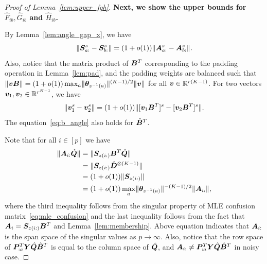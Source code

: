 \documentclass[journal]{IEEEtran}
\theoremstyle{definition}
\theoremstyle{definition}
\begin{document}
\begin{proof}[Proof of Lemma~\ref{lem:upper_fgh}]
{\textbf{Next, we show the upper bounds for $\hat F_{ib}, \hat G_{ib}$ and $\hat H_{ib}$.}

By Lemma~\ref{lem:angle_gap_x}, we have 
\begin{equation}
    \lVert\bm S_{a:}^s - \bm S_{b:}^s\rVert  = (1 + o(1)) \lVert\bm A_{a:}^s - \bm A_{b:}^s\rVert.
\end{equation}
Also, notice that the matrix product of $ \bm B^T$ corresponding to the padding operation in Lemma~\ref{lem:pad}, and the padding weights are balanced such that $\lVert\bm{v} \bm B\rVert  = (1 + o(1)) \max_{a} \lVert\boldsymbol{\theta}_{z^{-1}(a)}\rVert^{(K-1)/2} \lVert\bm{v}\rVert $ for all $\bm{v} \in \mathbb{R}^{r(K-1)}$. For two vectors $\bm{v}_1, \bm{v}_2 \in \mathbb{R}^{r^{K-1}}$, we have 
\begin{equation}\label{eq:b_angle}
    \onormSize{}{\mv_1^s - \mv_2^s} = (1 + o(1)) \onormSize{}{[\mv_1 \mB^T]^s -  [\mv_2 \mB^T]^s  }.
\end{equation}
The equation~\eqref{eq:b_angle} also holds for $\hat {\bm B}^T$.

Note that for all $i \in [p]$ we have 
\small
\begin{align}
    \onormSize{}{\mA_{i:} \hat \mQ} &= \onormSize{}{\mS_{z(i:)} \mB^T \hat \mQ }\\
    &=  \onormSize{}{\mS_{z(i:)} \hat \mD^{\otimes (K-1)} }\\
    &=  (1 + o(1)) \onormSize{}{\mS_{z(i:)}} \\
    &=  (1 + o(1)) \max_{a} \onormSize{}{\mtheta_{z^{-1}(a)}}^{-(K-1)/2} \onormSize{}{\mA_{i:}},  \label{eq:aq}
\end{align}
\normalsize
where the third inequality follows from the singular property of MLE confusion matrix~\eqref{eq:mle_confusion} and the last inequality follows from the fact that $\bm A_i = \bm S_{z(i:)} \bm B^T$ and Lemma~\ref{lem:membership}. Above equation indicates that $\bm A_{i:}$ is the span space of the singular values as $p \rightarrow \infty$. Also, notice that the row space of $\bm{P}_{:a}^T \bm Y \hat {\bm{Q}}  \hat {\bm B}^T$ is equal to the column space of $\hat {\bm{Q}}$, and $\bm A_{i:} \neq \bm{P}_{:a}^T \bm Y \hat {\bm{Q}}  \hat {\bm B}^T$ in noisy case. 

}
\end{proof}
\end{document}
